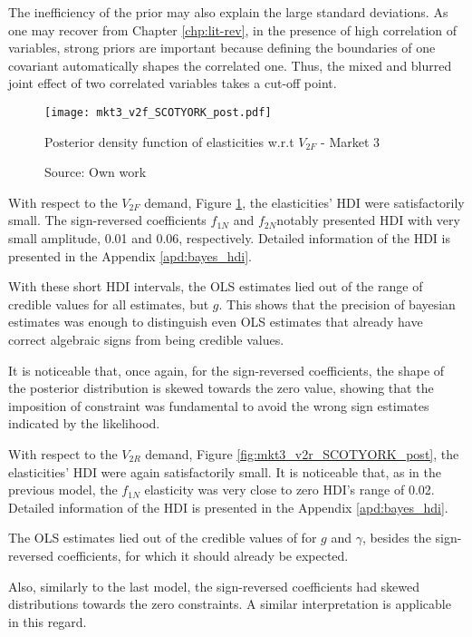 The inefficiency of the prior may also explain the large standard deviations. As one may recover from Chapter \ref{chp:lit-rev}, in the presence of high correlation of variables, strong priors are important because defining the boundaries of one covariant automatically shapes the correlated one. Thus, the mixed and blurred joint effect of two correlated variables takes a cut-off point.

\begin{figure}[H]
\centering
\texttt{[image: mkt3\_v2f\_SCOTYORK\_post.pdf]}
\caption{Posterior density function of elasticities w.r.t $V_{2F}$ - Market 3}
\label{fig:mkt3_v2f_SCOTYORK_post}
\caption*{Source: Own work}
\end{figure} 

With respect to the $V_{2F}$ demand, Figure \ref{fig:mkt3_v2f_SCOTYORK_post}, the elasticities' HDI were satisfactorily small. The sign-reversed coefficients $f_{1N}$ and $f_{2N}$notably presented HDI with very small amplitude, 0.01 and 0.06, respectively. Detailed information of the HDI is presented in the Appendix \ref{apd:bayes_hdi}. 

With these short HDI intervals, the OLS estimates lied out of the range of credible values for all estimates, but $g$. This shows that the precision of bayesian estimates was enough to distinguish even OLS estimates that already have correct algebraic signs from being credible values.

It is noticeable that, once again, for the sign-reversed coefficients, the shape of the posterior distribution is skewed towards the zero value, showing that the imposition of constraint was fundamental to avoid the wrong sign estimates indicated by the likelihood.

With respect to the $V_{2R}$ demand, Figure \ref{fig:mkt3_v2r_SCOTYORK_post}, the elasticities' HDI were again satisfactorily small. It is noticeable that, as in the previous model, the $f_{1N}$ elasticity was very close to zero HDI's range of 0.02. Detailed information of the HDI is presented in the Appendix \ref{apd:bayes_hdi}. 

The OLS estimates lied out of the credible values of for $g$ and $\gamma$, besides the sign-reversed coefficients, for which it should already be expected. 

Also, similarly to the last model, the sign-reversed coefficients had skewed distributions towards the zero constraints. A similar interpretation is applicable in this regard.

